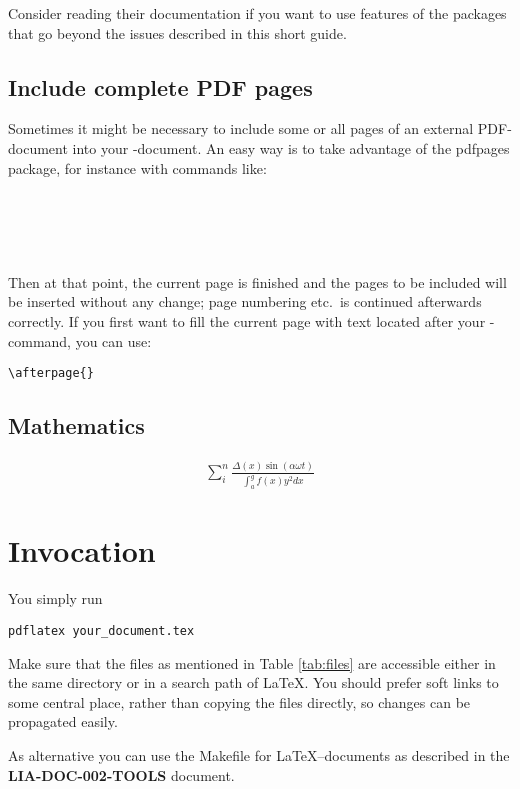 \documentclass{lia}
\newcommand{\CC}[1]{{\ttfamily #1}}
\begin{document}
Consider reading their documentation if you want to use features
of the packages that go beyond the issues described in this short guide.

\subsection{Include complete PDF pages}

Sometimes it might be necessary to include some or all pages of an
external PDF-document into your \Lia-document.
An easy way is to take advantage of the \CC{pdfpages} package, for instance
with commands like:

\begin{verbatim}





\end{verbatim}

Then at that point, the current page is finished and the pages to
be included will be inserted without any change;
page numbering etc.~is continued afterwards correctly.
If you first want to fill the current page with text located
after your \verb++-command, you can use:

\begin{verbatim}
\afterpage{}
\end{verbatim}

\subsection{Mathematics}

\begin{eqnarray}
\sum_i^n ­\frac{\Delta(x)\sin(\alpha\omega t)}{\int_a^g f(x) y^2 dx}
\end{eqnarray}

\section{Invocation}

You simply run

\begin{verbatim}
pdflatex your_document.tex
\end{verbatim}

Make sure that the files as mentioned in Table \ref{tab:files}
are accessible either in the same directory or in a search path of \LaTeX.
You should prefer soft links to some central place,
rather than copying the files directly,
so changes can be propagated easily.

As alternative you can use the \CC{Makefile} for \LaTeX--documents
as described in the {\bfseries LIA-DOC-002-TOOLS} document.
\end{document}
